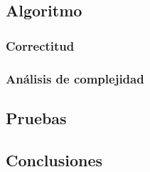  

\subsection{Algoritmo}
 

\subsubsection{Correctitud} 



\subsubsection{An\'alisis de complejidad}
 
 

\subsection{Pruebas}



\subsection{Conclusiones}
